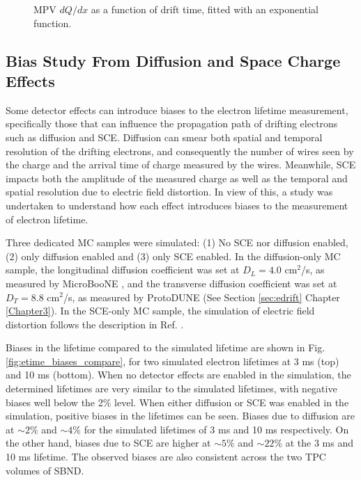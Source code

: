 \begin{figure}[hb!]
\begin{subfigure}[b]{0.495\textwidth}
        \end{subfigure}
        \caption[Most Probable Value dQ/dx Against Drift Time]{MPV $dQ/dx$ as a function of drift time, fitted with an exponential function.}
        \label{fig:etime_tpc}
\end{figure}

\subsection{Bias Study From Diffusion and Space Charge Effects}
\label{sec7:etime_bias}

Some detector effects can introduce biases to the electron lifetime measurement, specifically those that can influence the propagation path of drifting electrons such as diffusion and SCE.
Diffusion can smear both spatial and temporal resolution of the drifting electrons, and consequently the number of wires seen by the charge and the arrival time of charge measured by the wires.
Meanwhile, SCE impacts both the amplitude of the measured charge as well as the temporal and spatial resolution due to electric field distortion.
In view of this, a study was undertaken to understand how each effect introduces biases to the measurement of electron lifetime.

Three dedicated MC samples were simulated: (1) No SCE nor diffusion enabled, (2) only diffusion enabled and (3) only SCE enabled.
In the diffusion-only MC sample, the longitudinal diffusion coefficient was set at $D_{L} = 4.0 $ cm$^{2}$/s, as measured by MicroBooNE \cite{uboone_diff}, and the transverse diffusion coefficient was set at $D_T = 8.8 $ cm$^{2}$/s, as measured by ProtoDUNE \cite{protodune} (See Section \ref{sec:edrift} Chapter \ref{Chapter3}).     
In the SCE-only MC sample, the simulation of electric field distortion follows the description in Ref. \cite{SCE}.

Biases in the lifetime compared to the simulated lifetime are shown in Fig. \ref{fig:etime_biases_compare}, for two simulated electron lifetimes at 3 ms (top) and 10 ms (bottom).
When no detector effects are enabled in the simulation, the determined lifetimes are very similar to the simulated lifetimes, with negative biases well below the 2\% level.
When either diffusion or SCE was enabled in the simulation, positive biases in the lifetimes can be seen.
Biases due to diffusion are at $\sim 2\%$ and $\sim 4\%$ for the simulated lifetimes of 3 ms and 10 ms respectively.
On the other hand, biases due to SCE are higher at $\sim 5 \%$ and $\sim22 \%$ at the 3 ms and 10 ms lifetime.
The observed biases are also consistent across the two TPC volumes of SBND.


